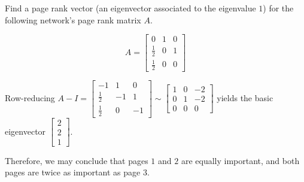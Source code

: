 \begin{applicationActivities}{5}{29}
\begin{activity}{10}
Find a page rank vector (an eigenvector associated to the eigenvalue $1$)
for the following network's page rank matrix \(A\).

\begin{multicols}{2}
\begin{center}
\end{center}

\[
  A
    =
  \begin{bmatrix}
    0 & 1 & 0 \\
    \frac{1}{2} & 0 & 1 \\
    \frac{1}{2} & 0 & 0
  \end{bmatrix}
\]
\end{multicols}
\end{activity}

\begin{observation}
Row-reducing
\(
  A-I
    =
  \begin{bmatrix}
    -1 & 1 & 0 \\
    \frac{1}{2} & -1 & 1 \\
    \frac{1}{2} & 0 & -1
  \end{bmatrix}
    \sim
  \begin{bmatrix}
    1 & 0 & -2 \\
    0 & 1 & -2 \\
    0 & 0 & 0
  \end{bmatrix}
\)
yields the basic eigenvector \(\begin{bmatrix} 2 \\ 2 \\1 \end{bmatrix}\).

Therefore, we may conclude that pages \(1\) and \(2\) are equally important,
and both pages are twice as important as page \(3\).
\begin{center}
\end{center}
\end{observation}
\end{applicationActivities}
